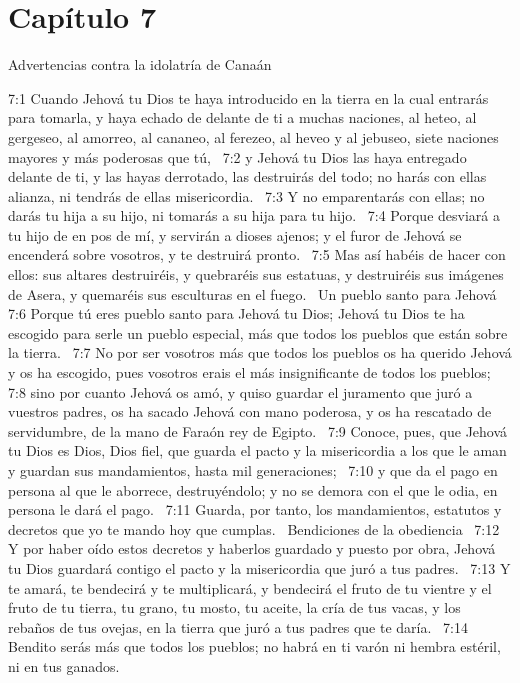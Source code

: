 \section*{Capítulo 7 }
Advertencias contra la idolatría de Canaán   

7:1 Cuando Jehová tu Dios te haya introducido en la tierra en la cual entrarás para tomarla, y haya echado de delante de ti a muchas naciones, al heteo, al gergeseo, al amorreo, al cananeo, al ferezeo, al heveo y al jebuseo, siete naciones mayores y más poderosas que tú,  
7:2 y Jehová tu Dios las haya entregado delante de ti, y las hayas derrotado, las destruirás del todo; no harás con ellas alianza, ni tendrás de ellas misericordia.  
7:3 Y no emparentarás con ellas; no darás tu hija a su hijo, ni tomarás a su hija para tu hijo.  
7:4 Porque desviará a tu hijo de en pos de mí, y servirán a dioses ajenos; y el furor de Jehová se encenderá sobre vosotros, y te destruirá pronto.  
7:5 Mas así habéis de hacer con ellos: sus altares destruiréis, y quebraréis sus estatuas, y destruiréis sus imágenes de Asera, y quemaréis sus esculturas en el fuego.  
Un pueblo santo para Jehová  
7:6 Porque tú eres pueblo santo para Jehová tu Dios; Jehová tu Dios te ha escogido para serle un pueblo especial, más que todos los pueblos que están sobre la tierra.  
7:7 No por ser vosotros más que todos los pueblos os ha querido Jehová y os ha escogido, pues vosotros erais el más insignificante de todos los pueblos;  
7:8 sino por cuanto Jehová os amó, y quiso guardar el juramento que juró a vuestros padres, os ha sacado Jehová con mano poderosa, y os ha rescatado de servidumbre, de la mano de Faraón rey de Egipto.  
7:9 Conoce, pues, que Jehová tu Dios es Dios, Dios fiel, que guarda el pacto y la misericordia a los que le aman y guardan sus mandamientos, hasta mil generaciones;  
7:10 y que da el pago en persona al que le aborrece, destruyéndolo; y no se demora con el que le odia, en persona le dará el pago.  
7:11 Guarda, por tanto, los mandamientos, estatutos y decretos que yo te mando hoy que cumplas.  
Bendiciones de la obediencia   
7:12 Y por haber oído estos decretos y haberlos guardado y puesto por obra, Jehová tu Dios guardará contigo el pacto y la misericordia que juró a tus padres.  
7:13 Y te amará, te bendecirá y te multiplicará, y bendecirá el fruto de tu vientre y el fruto de tu tierra, tu grano, tu mosto, tu aceite, la cría de tus vacas, y los rebaños de tus ovejas, en la tierra que juró a tus padres que te daría.  
7:14 Bendito serás más que todos los pueblos; no habrá en ti varón ni hembra estéril, ni en tus ganados.  
